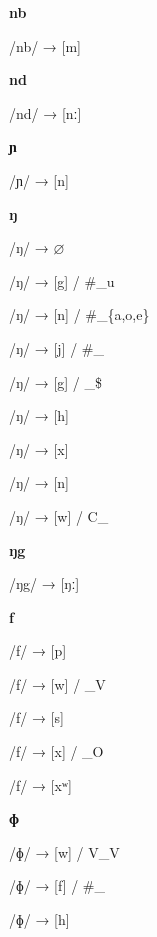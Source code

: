 \begin{center}\textbf{nb}\end{center}
\begin{multicols}{4}
\noindent /nb/ → [m]
\end{multicols}


\begin{center}\textbf{nd}\end{center}
\begin{multicols}{4}
\noindent /nd/ → [nː]
\end{multicols}


\begin{center}\textbf{ɲ}\end{center}
\begin{multicols}{4}
\noindent /ɲ/ → [n]
\end{multicols}


\begin{center}\textbf{ŋ}\end{center}
\begin{multicols}{4}
\noindent /ŋ/ → $\varnothing$

\noindent /ŋ/ → [g] / \#\_u

\noindent /ŋ/ → [n] / \#\_\{a,o,e\}

\noindent /ŋ/ → [j] / \#\_

\noindent /ŋ/ → [g] / \_\$

\noindent /ŋ/ → [h]

\noindent /ŋ/ → [x]

\noindent /ŋ/ → [n]

\noindent /ŋ/ → [w] / C\_
\end{multicols}


\begin{center}\textbf{ŋg}\end{center}
\begin{multicols}{4}
\noindent /ŋg/ → [ŋː]
\end{multicols}


\begin{center}\textbf{f}\end{center}
\begin{multicols}{4}
\noindent /f/ → [p]

\noindent /f/ → [w] / \_V

\noindent /f/ → [s]

\noindent /f/ → [x] / \_O

\noindent /f/ → [xʷ]
\end{multicols}


\begin{center}\textbf{ɸ}\end{center}
\begin{multicols}{4}
\noindent /ɸ/ → [w] / V\_V

\noindent /ɸ/ → [f] / \#\_

\noindent /ɸ/ → [h]
\end{multicols}

